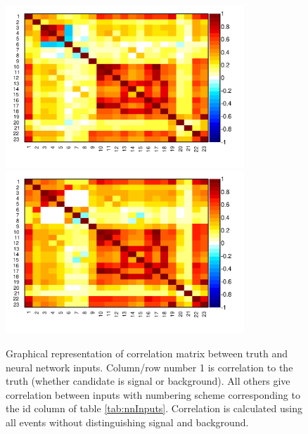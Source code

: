 \begin{figure}
\centering
\includegraphics[width=0.8\textwidth]{RKst/figs/Training/electrons/correlation.pdf}
\includegraphics[width=0.8\textwidth]{RKst/figs/Training/muons/correlation.pdf}
\caption{Graphical representation of correlation matrix between truth and neural network inputs.
Column/row number 1 is correlation to the truth (whether candidate is signal or background). All
others give correlation between inputs with numbering scheme corresponding to the id column of table
\ref{tab:nnInputs}. Correlation is calculated using all events without distinguishing signal and
background.}
\label{fig:Rkst_nnCorrelation}
\end{figure}
%

